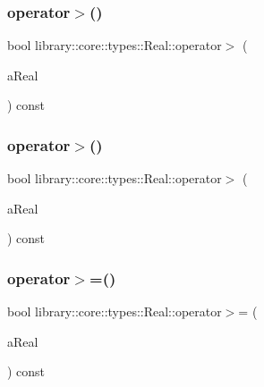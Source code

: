 \mbox{\label{classlibrary_1_1core_1_1types_1_1_real_aa7b6bce540a32bb0bc4d11eba53b80dc}} 
\subsubsection{\texorpdfstring{operator$>$()}{operator>()}\hspace{0.1cm}{\footnotesize\ttfamily [1/2]}}
{\footnotesize\ttfamily bool library\+::core\+::types\+::\+Real\+::operator$>$ (\begin{DoxyParamCaption}\item[{const \hyperlink{classlibrary_1_1core_1_1types_1_1_real}{Real} \&}]{a\+Real }\end{DoxyParamCaption}) const}

\mbox{\label{classlibrary_1_1core_1_1types_1_1_real_a36906548aeef8ab50e79ab6474be2f07}} 
\subsubsection{\texorpdfstring{operator$>$()}{operator>()}\hspace{0.1cm}{\footnotesize\ttfamily [2/2]}}
{\footnotesize\ttfamily bool library\+::core\+::types\+::\+Real\+::operator$>$ (\begin{DoxyParamCaption}\item[{const \hyperlink{classlibrary_1_1core_1_1types_1_1_real_a9c5c8826b7e5a8e39544d23fea6c0e1c}{Real\+::\+Value\+Type} \&}]{a\+Real }\end{DoxyParamCaption}) const}

\mbox{\label{classlibrary_1_1core_1_1types_1_1_real_a5046bc6db8251a1d3ac5bbc43f07db5d}} 
\subsubsection{\texorpdfstring{operator$>$=()}{operator>=()}\hspace{0.1cm}{\footnotesize\ttfamily [1/2]}}
{\footnotesize\ttfamily bool library\+::core\+::types\+::\+Real\+::operator$>$= (\begin{DoxyParamCaption}\item[{const \hyperlink{classlibrary_1_1core_1_1types_1_1_real}{Real} \&}]{a\+Real }\end{DoxyParamCaption}) const}

